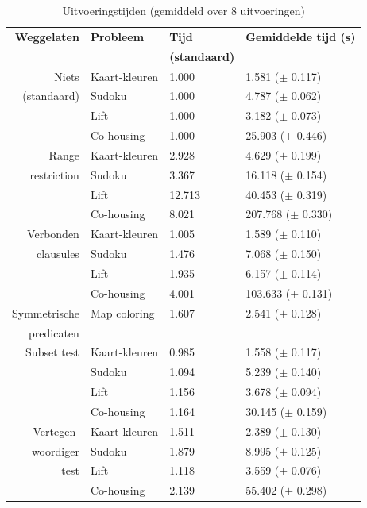 \documentclass{llncs}
\begin{document}
\begin{table}
  \caption{Uitvoeringstijden (gemiddeld over 8 uitvoeringen)}
  \begin{tabularx}{\linewidth}{rl|ll}

\textbf{Weggelaten}  & \textbf{Probleem}    & \textbf{Tijd}  & \textbf{Gemiddelde tijd (s)}\\
& & \textbf{(standaard)}\\
\toprule
Niets          & Kaart-kleuren  & 1.000       & 1.581   ($\pm$ 0.117)        \\
   (standaard)                   & Sudoku    & 1.000               & 4.787   ($\pm$ 0.062)    \\
                      & Lift    & 1.000             & 3.182   ($\pm$ 0.073)  \\
                      & Co-housing  & 1.000             & 25.903  ($\pm$ 0.446)  \\
\midrule
Range      & Kaart-kleuren  & 2.928           & 4.629   ($\pm$ 0.199)\\
      restriction                  & Sudoku    & 3.367             & 16.118  ($\pm$ 0.154)  \\
                        & Lift    & 12.713          & 40.453  ($\pm$ 0.319)\\
                        & Co-housing  & 8.021           & 207.768 ($\pm$ 0.330)\\
\midrule
Verbonden    & Kaart-kleuren  & 1.005           & 1.589   ($\pm$ 0.110)\\
    clausules       & Sudoku    & 1.476                          & 7.068   ($\pm$ 0.150)    \\
                        & Lift    & 1.935           & 6.157   ($\pm$ 0.114)\\
                        & Co-housing  & 4.001           & 103.633 ($\pm$ 0.131)\\
\midrule
Symmetrische  & Map coloring  & 1.607        & 2.541   ($\pm$ 0.128)\\
predicaten\\
\midrule
Subset test       & Kaart-kleuren  & 0.985               & 1.558   ($\pm$ 0.117)    \\
                        & Sudoku    & 1.094             & 5.239   ($\pm$ 0.140)  \\
                        & Lift    & 1.156           & 3.678   ($\pm$ 0.094)\\
                        & Co-housing  & 1.164           & 30.145  ($\pm$ 0.159)\\
\midrule
Vertegen-   & Kaart-kleuren  & 1.511        & 2.389   ($\pm$ 0.130)\\
             woordiger          & Sudoku    & 1.879               & 8.995   ($\pm$ 0.125)    \\
                test      & Lift    & 1.118             & 3.559   ($\pm$ 0.076)  \\
                      & Co-housing  & 2.139             & 55.402  ($\pm$ 0.298)  \\
  \end{tabularx}
  \label{tbl:uitvoering}
\end{table}
\end{document}
